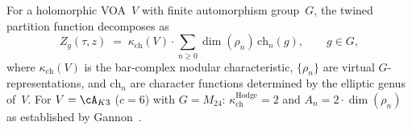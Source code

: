 \begin{conjecture}
\label{conj:universal-moonshine-multiplier}
\ClaimStatusConjectured
{}
For a holomorphic VOA~$V$ with finite automorphism group~$G$,
the twined partition function decomposes as
\[
Z_g(\tau,z)
\;=\;
\kappa_{\mathrm{ch}}(V) \cdot \sum_{n \geq 0}
\dim(\rho_n)\,\mathrm{ch}_n(g),
\qquad g \in G,
\]
where $\kappa_{\mathrm{ch}}(V)$ is the bar-complex modular characteristic,
$\{\rho_n\}$ are virtual $G$-representations, and
$\mathrm{ch}_n$ are character functions determined by the
elliptic genus of~$V$. For $V = \cA_{K3}$ ($c = 6$) with
$G = M_{24}$: $\kappa_{\mathrm{ch}}^{\mathrm{Hodge}} = 2$ and
$A_n = 2 \cdot \dim(\rho_n)$ as established by Gannon~\cite{Gannon16}.
\end{conjecture}

